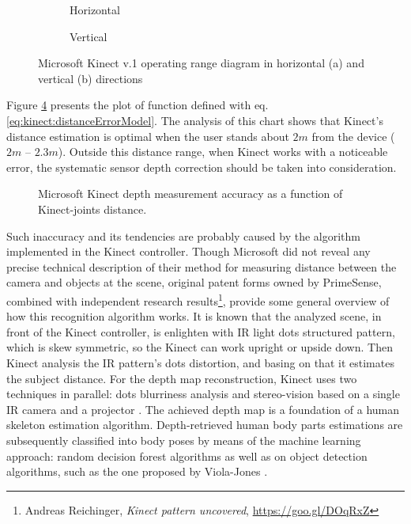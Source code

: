 \documentclass[sensors,article,submit,moreauthors,pdftex,10pt,a4paper]{mdpi}
\begin{document}
\begin{figure}[H]
	\centering
	\begin{subfigure}[b]{0.4\textwidth}
		\centering
		
		\caption{Horizontal}
		\label{fig:kinect:range:a}
	\end{subfigure} \hfill
	\begin{subfigure}[b]{0.4\textwidth}
		\centering
		
		\caption{Vertical}
		\label{fig:kinect:range:b}
	\end{subfigure} \hfill
	\begin{subfigure}[p]{0.18\textwidth}
		\hfill
		               
	\end{subfigure}
	\caption{Microsoft Kinect v.1 operating range diagram in horizontal (a) and vertical (b) directions}
	\label{fig:kinect:range}
\end{figure}   

Figure \ref{fig:kinect:distanceAccuracy} presents the plot of function defined with eq. \ref{eq:kinect:distanceErrorModel}. The analysis of this chart shows that Kinect’s distance estimation is optimal when the user stands about $2m$ from the device ($2m$ – $2.3m$). Outside this distance range, when Kinect works with a noticeable error, the systematic sensor depth correction should be taken into consideration.

\begin{figure}[H]
	\centering	
											
	\caption{Microsoft Kinect depth measurement accuracy as a function of Kinect-joints distance.}
	\label{fig:kinect:distanceAccuracy}
\end{figure}

Such inaccuracy and its tendencies are probably caused by the algorithm implemented in the Kinect controller. Though Microsoft did not reveal any precise technical description of their method for measuring distance between the camera and objects at the scene, original patent forms \cite{patent:20100118123,patent:20100020078,patent:20080106746} owned by PrimeSense, combined with independent research results\footnote{Andreas Reichinger, \textit{Kinect pattern uncovered}, \url{https://goo.gl/DOqRxZ}}, provide some general overview of how this recognition algorithm works. It is known that the analyzed scene, in front of the Kinect controller, is enlighten with IR light dots structured pattern, which is skew symmetric, so the Kinect can work upright or upside down. Then Kinect analysis the IR pattern’s dots distortion, and basing on that it estimates the subject distance. For the depth map reconstruction, Kinect uses two techniques in parallel: dots blurriness analysis \cite{Fofi2004} and stereo-vision based on a single IR camera and a projector \cite{Rzeszotarski2006}. The achieved depth map is a foundation of a human skeleton estimation algorithm. Depth-retrieved human body parts estimations are subsequently classified into body poses by means of the machine learning approach: random decision forest algorithms as well as on object detection algorithms, such as the one proposed by Viola-Jones \cite{Shotton2008, Shotton2011a}. 
\end{document}
